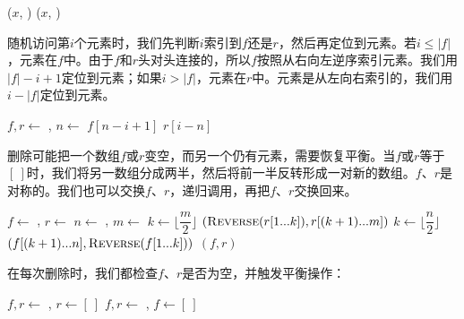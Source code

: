 \documentclass[b5paper]{ctexart}
\begin{document}
\begin{algorithmic}[1]
  \State {}($x$, )
\EndFunction
{}
  \State {}($x$, )
\EndFunction
\end{algorithmic}

随机访问第$i$个元素时，我们先判断$i$索引到$f$还是$r$，然后再定位到元素。若$ i \leq |f|$，元素在$f$中。由于$f$和$r$头对头连接的，所以$f$按照从右向左逆序索引元素。我们用$|f| - i + 1$定位到元素；如果$i > |f|$，元素在$r$中。元素是从左向右索引的，我们用$i - |f|$定位到元素。

\begin{algorithmic}[1]
  \State $f, r \gets $ , 
  \State $n \gets $ 
    \State \Return $f[n - i + 1]$ 
  \Else
    \State \Return $r[i - n]$
  \EndIf
\EndFunction
\end{algorithmic}

删除可能把一个数组$f$或$r$变空，而另一个仍有元素，需要恢复平衡。当$f$或$r$等于$[\ ]$时，我们将另一数组分成两半，然后将前一半反转形成一对新的数组。$f$、$r$是对称的。我们也可以交换$f$、$r$，递归调用，再把$f$、$r$交换回来。

\begin{algorithmic}[1]
  \State $f \gets$ , $r \gets$ 
  \State $n \gets$ , $m \gets$ 
    \State $k \gets \lfloor \dfrac{m}{2} \rfloor$
    \State \Return $(\textproc{Reverse}(r[1 ... k]), r[(k + 1) ... m])$
  \EndIf
    \State $k \gets \lfloor \dfrac{n}{2} \rfloor$
    \State \Return $(f[(k + 1) ... n], \textproc{Reverse}(f[1 ... k]))$
  \EndIf
  \State \Return $(f, r)$
\EndFunction
\end{algorithmic}

在每次删除时，我们都检查$f$、$r$是否为空，并触发平衡操作：

\begin{algorithmic}[1]
  \State {}
  \State $f, r \gets$ , 
   
    \State $r \gets [\ ]$
  \Else
    \State {}
  \EndIf
\EndFunction
\Statex
{}
  \State {}
  \State $f, r \gets$ , 
   
    \State $f \gets [\ ]$
  \Else
    \State {}
  \EndIf
\EndFunction
\end{algorithmic}
\end{document}
